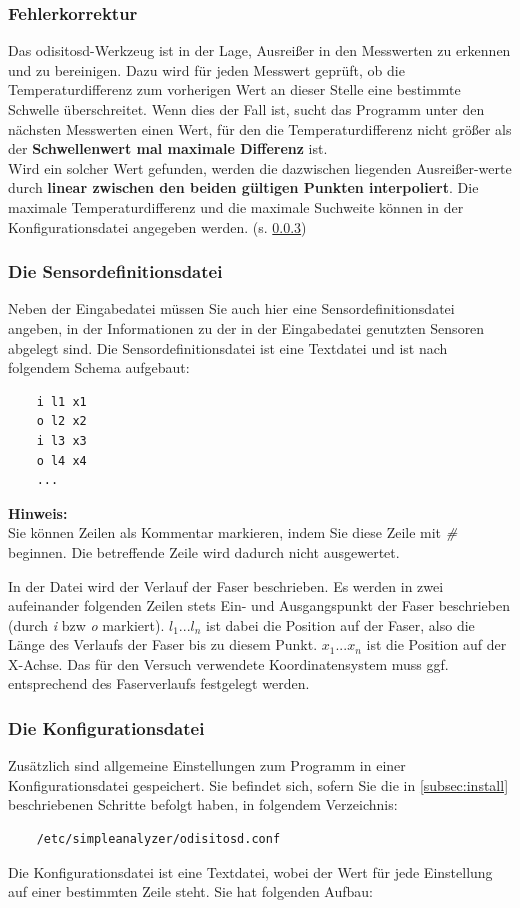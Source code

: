 \documentclass[10pt,a5paper,twoside,titlepage]{scrartcl}
\newenvironment{myshaded}
  {\def\FrameCommand{\colorbox{shadecolor}}
    \MakeFramed {\advance\hsize-\width \FrameRestore}}
 {\endMakeFramed}
\newenvironment{hinweis}
  {\colorlet{shadecolor}{black!20}%
      \begin{myshaded}
      \begin{minipage}{\linewidth}
	  \hangindent 20pt  
      \textbf{Hinweis:}\\
      }
  {\end{minipage}\end{myshaded}}
\begin{document}
	\subsubsection{Fehlerkorrektur}
	Das odisitosd-Werkzeug ist in der Lage, Ausreißer in den Messwerten zu erkennen und zu bereinigen.
	Dazu wird für jeden Messwert geprüft, ob die Temperaturdifferenz zum vorherigen Wert an dieser Stelle eine bestimmte Schwelle überschreitet. Wenn dies der Fall ist, sucht das Programm unter den nächsten Messwerten einen Wert, für den die Temperaturdifferenz nicht größer als der \textbf{Schwellenwert mal maximale Differenz} ist.\\
	Wird ein solcher Wert gefunden, werden die dazwischen liegenden Ausreißer-werte durch \textbf{linear zwischen den beiden gültigen Punkten interpoliert}.
	Die maximale Temperaturdifferenz und die maximale Suchweite können in der Konfigurationsdatei angegeben werden. (s. \ref{subsec:conf_odisitosd})
	\subsubsection{Die Sensordefinitionsdatei}
	\label{subsec:sdef_odisitosd}
	Neben der Eingabedatei müssen Sie auch hier eine Sensordefinitionsdatei angeben, in der Informationen zu der in der Eingabedatei genutzten Sensoren abgelegt sind. Die Sensordefinitionsdatei ist eine Textdatei und ist nach folgendem Schema aufgebaut:\\
	\begin{lstlisting}
	i l1 x1
	o l2 x2
	i l3 x3
	o l4 x4
	...
	\end{lstlisting}
	\begin{hinweis}
	Sie können Zeilen als Kommentar markieren, indem Sie diese Zeile mit \emph{\#} beginnen. Die betreffende Zeile wird dadurch nicht ausgewertet.
	\end{hinweis}
	In der Datei wird der Verlauf der Faser beschrieben. Es werden in zwei aufeinander folgenden Zeilen stets Ein- und Ausgangspunkt der Faser beschrieben (durch \emph{i} bzw \emph{o} markiert). $l_1...l_n$ ist dabei die Position auf der Faser, also die Länge des Verlaufs der Faser bis zu diesem Punkt. $x_1...x_n$ ist die Position auf der X-Achse. Das für den Versuch verwendete Koordinatensystem muss ggf. entsprechend des Faserverlaufs festgelegt werden.	
	\subsubsection{Die Konfigurationsdatei}
	\label{subsec:conf_odisitosd}
	Zusätzlich sind allgemeine Einstellungen zum Programm in einer Konfigurationsdatei gespeichert. Sie befindet sich, sofern Sie die in \ref{subsec:install} beschriebenen Schritte befolgt haben, in folgendem Verzeichnis:
	\begin{lstlisting}
	/etc/simpleanalyzer/odisitosd.conf
	\end{lstlisting}
	Die Konfigurationsdatei ist eine Textdatei, wobei der Wert für jede Einstellung auf einer bestimmten Zeile steht. Sie hat folgenden Aufbau:\\
	
\end{document}
